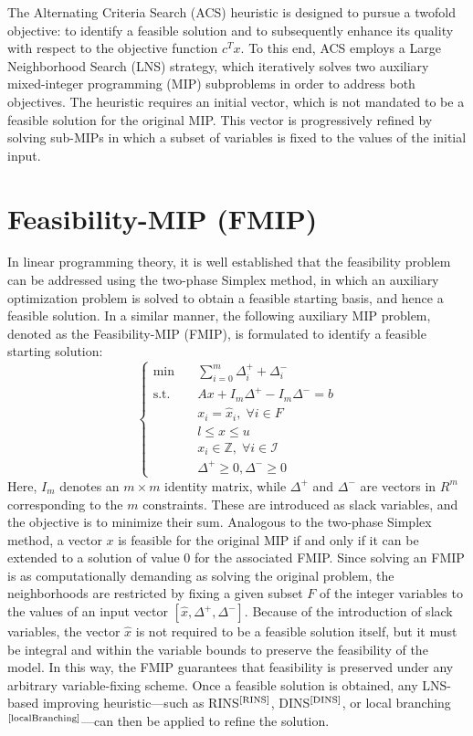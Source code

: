 The Alternating Criteria Search (ACS) heuristic is designed to pursue a twofold objective: to identify a feasible solution and to subsequently enhance its quality with respect to the objective function $c^T x$. To this end, ACS employs a Large Neighborhood Search (LNS) strategy, which iteratively solves two auxiliary mixed-integer programming (MIP) subproblems in order to address both objectives.
The heuristic requires an initial vector, which is not mandated to be a feasible solution for the original MIP. This vector is progressively refined by solving sub-MIPs in which a subset of variables is fixed to the values of the initial input.
\section{Feasibility-MIP (FMIP)}
In linear programming theory, it is well established that the feasibility problem can be addressed using the two-phase Simplex method, in which an auxiliary optimization problem is solved to obtain a feasible starting basis, and hence a feasible solution.
In a similar manner, the following auxiliary MIP problem, denoted as the Feasibility-MIP (FMIP), is formulated to identify a feasible starting solution:
\begin{equation}
\begin{cases}
\text{min} \quad & \sum_{i=0}^m \Delta_i^{+}+\Delta_i^{-} \\ \text{s.t.} \quad & Ax + I_m\Delta^+ - I_m\Delta^- =b\\ & x_i = \hat{x}_i, \; \forall i \in F\\ & l \le x \le u\\ & x_i \in \mathbb{Z}, \; \forall i \in \mathcal{I} \\ & \Delta^+ \ge 0, \Delta^- \ge 0 
\end{cases}
\end{equation}
Here, $I_m$ denotes an $m \times m$ identity matrix, while $\Delta^+$ and $\Delta^-$ are vectors in $R^m$ corresponding to the $m$ constraints. These are introduced as slack variables, and the objective is to minimize their sum. 
Analogous to the two-phase Simplex method, a vector $x$ is feasible for the original MIP if and only if it can be extended to a solution of value $0$ for the associated FMIP. Since solving an FMIP is as computationally demanding as solving the original problem, the neighborhoods are restricted by fixing a given subset $F$ of the integer variables to the values of an input vector $[\hat{x}, \Delta^+, \Delta^-]$. Because of the introduction of slack variables, the vector $\hat{x}$ is not required to be a feasible solution itself, but it must be integral and within the variable bounds to preserve the feasibility of the model. In this way, the FMIP guarantees that feasibility is preserved under any arbitrary variable-fixing scheme. Once a feasible solution is obtained, any LNS-based improving heuristic—such as RINS$^\text{\cite{RINS}}$, DINS$^\text{\cite{DINS}}$, or local branching$^\text{\cite{localBranching}}$—can then be applied to refine the solution.
